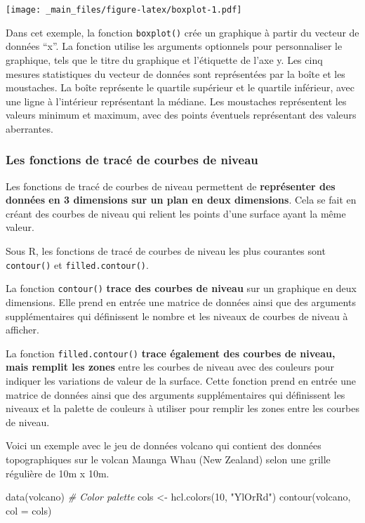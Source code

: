\documentclass[
]{article}
\newenvironment{Shaded}{\begin{snugshade}}{\end{snugshade}}
\newcommand{\AttributeTok}[1]{\textcolor[rgb]{0.77,0.63,0.00}{#1}}
\newcommand{\CommentTok}[1]{\textcolor[rgb]{0.56,0.35,0.01}{\textit{#1}}}
\newcommand{\DecValTok}[1]{\textcolor[rgb]{0.00,0.00,0.81}{#1}}
\newcommand{\FunctionTok}[1]{\textcolor[rgb]{0.00,0.00,0.00}{#1}}
\newcommand{\NormalTok}[1]{#1}
\newcommand{\OtherTok}[1]{\textcolor[rgb]{0.56,0.35,0.01}{#1}}
\newcommand{\StringTok}[1]{\textcolor[rgb]{0.31,0.60,0.02}{#1}}
\begin{document}
\texttt{[image: \_main\_files/figure-latex/boxplot-1.pdf]}

Dans cet exemple, la fonction \texttt{boxplot()} crée un graphique à partir du vecteur de données ``x''. La fonction utilise les arguments optionnels pour personnaliser le graphique, tels que le titre du graphique et l'étiquette de l'axe y. Les cinq mesures statistiques du vecteur de données sont représentées par la boîte et les moustaches. La boîte représente le quartile supérieur et le quartile inférieur, avec une ligne à l'intérieur représentant la médiane. Les moustaches représentent les valeurs minimum et maximum, avec des points éventuels représentant des valeurs aberrantes.

\hypertarget{les-fonctions-de-tracuxe9-de-courbes-de-niveau}{%
\subsubsection{Les fonctions de tracé de courbes de niveau}\label{les-fonctions-de-tracuxe9-de-courbes-de-niveau}}

Les fonctions de tracé de courbes de niveau permettent de \textbf{représenter des données en 3 dimensions sur un plan en deux dimensions}. Cela se fait en créant des courbes de niveau qui relient les points d'une surface ayant la même valeur.

Sous R, les fonctions de tracé de courbes de niveau les plus courantes sont \texttt{contour()} et \texttt{filled.contour()}.

La fonction \texttt{contour()} \textbf{trace des courbes de niveau} sur un graphique en deux dimensions. Elle prend en entrée une matrice de données ainsi que des arguments supplémentaires qui définissent le nombre et les niveaux de courbes de niveau à afficher.

La fonction \texttt{filled.contour()} \textbf{trace également des courbes de niveau, mais remplit les zones} entre les courbes de niveau avec des couleurs pour indiquer les variations de valeur de la surface. Cette fonction prend en entrée une matrice de données ainsi que des arguments supplémentaires qui définissent les niveaux et la palette de couleurs à utiliser pour remplir les zones entre les courbes de niveau.

Voici un exemple avec le jeu de données volcano qui contient des données topographiques sur le volcan Maunga Whau (New Zealand) selon une grille régulière de 10m x 10m.

\begin{Shaded}
\begin{Highlighting}[]
\FunctionTok{data}\NormalTok{(volcano)}
\CommentTok{\# Color palette}
\NormalTok{cols }\OtherTok{\textless{}{-}} \FunctionTok{hcl.colors}\NormalTok{(}\DecValTok{10}\NormalTok{, }\StringTok{"YlOrRd"}\NormalTok{)}
\FunctionTok{contour}\NormalTok{(volcano,}
        \AttributeTok{col =}\NormalTok{ cols)}
\end{Highlighting}
\end{Shaded}
\end{document}
